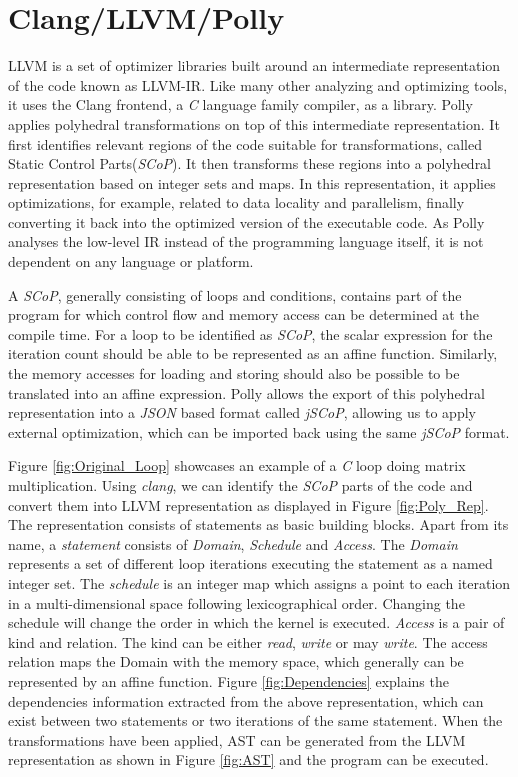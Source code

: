 \documentclass[logo,msc]{infthesis}           %
\begin{document}
\section{Clang/LLVM/Polly}

LLVM is a set of optimizer libraries built around an intermediate representation of the code known as LLVM-IR. Like many other analyzing and optimizing tools, it uses the Clang frontend, a \textit{C} language family compiler, as a library.
Polly applies polyhedral transformations on top of this intermediate representation\cite{grosser2011polly}. It first identifies relevant regions of the code suitable for transformations, called Static Control Parts(\textit{SCoP})\cite{grosser2011polly}. It then transforms these regions into a polyhedral representation based on integer sets and maps. In this representation, it applies optimizations, for example, related to data locality and parallelism, finally converting it back into the optimized version of the executable code. As Polly analyses the low-level IR instead of the programming language itself, it is not dependent on any language or platform.

A \textit{SCoP}, generally consisting of loops and conditions, contains part of the program for which control flow and memory access can be determined at the compile time. For a loop to be identified as \textit{SCoP}, the scalar expression for the iteration count should be able to be represented as an affine function. Similarly, the memory accesses for loading and storing should also be possible to be translated into an affine expression. Polly allows the export of this polyhedral representation into a \textit{JSON} based format called \textit{jSCoP},
allowing us to apply external optimization, which can be imported back using the same \textit{jSCoP} format.

 Figure \ref{fig:Original_Loop} showcases an example of a \textit{C} loop doing matrix multiplication. Using \textit{clang}, we can identify the \textit{SCoP} parts of the code and convert them into LLVM representation as displayed in Figure \ref{fig:Poly_Rep}. The representation consists of statements as basic building blocks. Apart from its name, a \textit{statement} consists of \textit{Domain}, \textit{Schedule} and \textit{Access}. The \textit{Domain} represents a set of different loop iterations executing the statement as a named integer set. The \textit{schedule} is an integer map which assigns a point to each iteration in a multi-dimensional space following lexicographical order. Changing the schedule will change the order in which the kernel is executed. \textit{Access} is a pair of kind and relation. The kind can be either \textit{read}, \textit{write} or may \textit{write}. The access relation maps the Domain with the memory space, which generally can be represented by an affine function. Figure \ref{fig:Dependencies} explains the dependencies information extracted from the above representation, which can exist between two statements or two iterations of the same statement. When the transformations have been applied, AST can be generated from the LLVM representation as shown in Figure \ref{fig:AST} and the program can be executed\cite{10.1145/2743016}.
\end{document}
